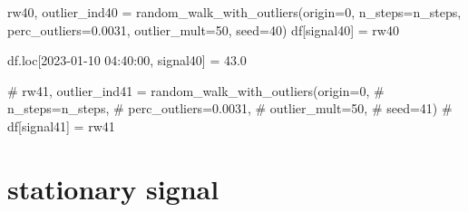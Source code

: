 \documentclass[
  letterpaper,
  DIV=11,
  numbers=noendperiod,
  oneside]{scrreprt}
\newenvironment{Shaded}{\begin{snugshade}}{\end{snugshade}}
\newcommand{\CommentTok}[1]{\textcolor[rgb]{0.37,0.37,0.37}{#1}}
\newcommand{\DecValTok}[1]{\textcolor[rgb]{0.68,0.00,0.00}{#1}}
\newcommand{\FloatTok}[1]{\textcolor[rgb]{0.68,0.00,0.00}{#1}}
\newcommand{\NormalTok}[1]{\textcolor[rgb]{0.00,0.23,0.31}{#1}}
\newcommand{\OperatorTok}[1]{\textcolor[rgb]{0.37,0.37,0.37}{#1}}
\newcommand{\StringTok}[1]{\textcolor[rgb]{0.13,0.47,0.30}{#1}}
\begin{document}
\begin{Shaded}
\begin{Highlighting}[]
\NormalTok{rw40, outlier\_ind40 }\OperatorTok{=}\NormalTok{ random\_walk\_with\_outliers(origin}\OperatorTok{=}\DecValTok{0}\NormalTok{,}
\NormalTok{                                            n\_steps}\OperatorTok{=}\NormalTok{n\_steps,}
\NormalTok{                                            perc\_outliers}\OperatorTok{=}\FloatTok{0.0031}\NormalTok{,}
\NormalTok{                                            outlier\_mult}\OperatorTok{=}\DecValTok{50}\NormalTok{,}
\NormalTok{                                            seed}\OperatorTok{=}\DecValTok{40}\NormalTok{)}
\NormalTok{df[}\StringTok{\textquotesingle{}signal40\textquotesingle{}}\NormalTok{] }\OperatorTok{=}\NormalTok{ rw40}

\NormalTok{df.loc[}\StringTok{\textquotesingle{}2023{-}01{-}10 04:40:00\textquotesingle{}}\NormalTok{, }\StringTok{\textquotesingle{}signal40\textquotesingle{}}\NormalTok{] }\OperatorTok{=} \FloatTok{43.0}
\end{Highlighting}
\end{Shaded}

\begin{Shaded}
\begin{Highlighting}[]
\CommentTok{\# rw41, outlier\_ind41 = random\_walk\_with\_outliers(origin=0,}
\CommentTok{\#                                             n\_steps=n\_steps,}
\CommentTok{\#                                             perc\_outliers=0.0031,}
\CommentTok{\#                                             outlier\_mult=50,}
\CommentTok{\#                                             seed=41)}
\CommentTok{\# df[\textquotesingle{}signal41\textquotesingle{}] = rw41}
\end{Highlighting}
\end{Shaded}

\hypertarget{stationary-signal}{%
\section{stationary signal}\label{stationary-signal}}
\end{document}
